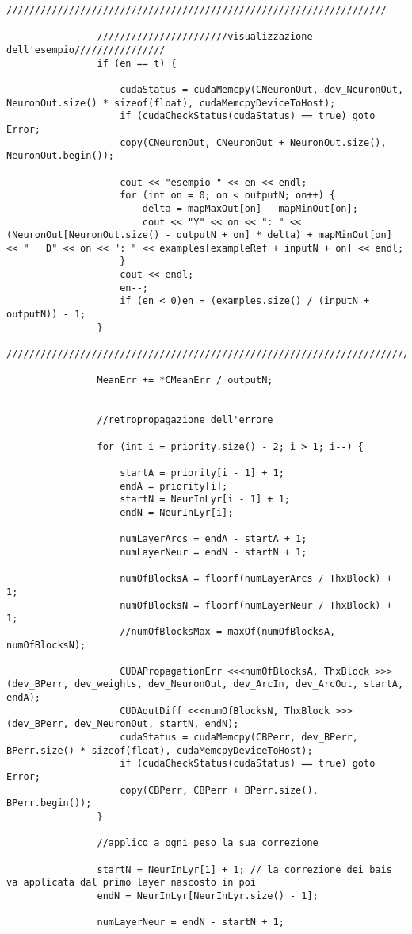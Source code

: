 \documentclass[10pt,a4paper]{article}
\begin{document}
\begin{lstlisting}[style=mycuda, caption=librerie usate, captionpos=b]
				///////////////////////////////////////////////////////////////////

				///////////////////////visualizzazione dell'esempio////////////////
				if (en == t) {

					cudaStatus = cudaMemcpy(CNeuronOut, dev_NeuronOut, NeuronOut.size() * sizeof(float), cudaMemcpyDeviceToHost);
					if (cudaCheckStatus(cudaStatus) == true) goto Error;
					copy(CNeuronOut, CNeuronOut + NeuronOut.size(), NeuronOut.begin());

					cout << "esempio " << en << endl;
					for (int on = 0; on < outputN; on++) {
						delta = mapMaxOut[on] - mapMinOut[on];
						cout << "Y" << on << ": " << (NeuronOut[NeuronOut.size() - outputN + on] * delta) + mapMinOut[on] << "   D" << on << ": " << examples[exampleRef + inputN + on] << endl;
					}
					cout << endl;
					en--;
					if (en < 0)en = (examples.size() / (inputN + outputN)) - 1;
				}
				//////////////////////////////////////////////////////////////////////////////////////

				MeanErr += *CMeanErr / outputN;


				//retropropagazione dell'errore

				for (int i = priority.size() - 2; i > 1; i--) {

					startA = priority[i - 1] + 1;
					endA = priority[i];
					startN = NeurInLyr[i - 1] + 1;
					endN = NeurInLyr[i];

					numLayerArcs = endA - startA + 1;
					numLayerNeur = endN - startN + 1;

					numOfBlocksA = floorf(numLayerArcs / ThxBlock) + 1;
					numOfBlocksN = floorf(numLayerNeur / ThxBlock) + 1;
					//numOfBlocksMax = maxOf(numOfBlocksA, numOfBlocksN);

					CUDAPropagationErr <<<numOfBlocksA, ThxBlock >>> (dev_BPerr, dev_weights, dev_NeuronOut, dev_ArcIn, dev_ArcOut, startA, endA);
					CUDAoutDiff <<<numOfBlocksN, ThxBlock >>> (dev_BPerr, dev_NeuronOut, startN, endN);
					cudaStatus = cudaMemcpy(CBPerr, dev_BPerr, BPerr.size() * sizeof(float), cudaMemcpyDeviceToHost);
					if (cudaCheckStatus(cudaStatus) == true) goto Error;
					copy(CBPerr, CBPerr + BPerr.size(), BPerr.begin());
				}

				//applico a ogni peso la sua correzione

				startN = NeurInLyr[1] + 1; // la correzione dei bais va applicata dal primo layer nascosto in poi
				endN = NeurInLyr[NeurInLyr.size() - 1];

				numLayerNeur = endN - startN + 1;


\end{lstlisting}
\end{document}
